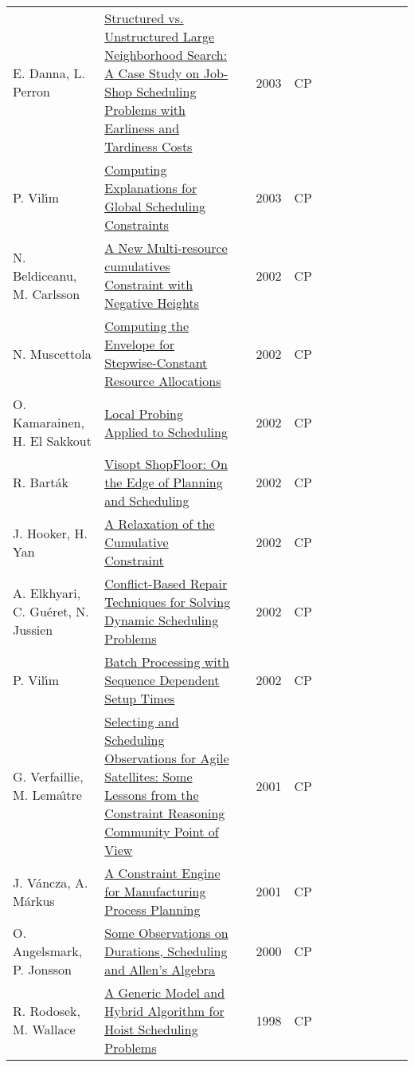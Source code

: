 {\begin{longtable}{p{3cm}p{6cm}rrcrlcccp{1.5cm}l}
E. Danna, L. Perron& \href{papers/DannaP03.pdf}{Structured vs. Unstructured Large Neighborhood Search: {A} Case Study on Job-Shop Scheduling Problems with Earliness and Tardiness Costs} & \cite{DannaP03} & 2003 & CP & & & & & & & \\
P. Vil{\'{\i}}m& \href{papers/Vilim03.pdf}{Computing Explanations for Global Scheduling Constraints} & \cite{Vilim03} & 2003 & CP & & & & & & & \\
N. Beldiceanu, M. Carlsson& \href{papers/BeldiceanuC02.pdf}{A New Multi-resource cumulatives Constraint with Negative Heights} & \cite{BeldiceanuC02} & 2002 & CP & & & & & & & \\
N. Muscettola& \href{papers/Muscettola02.pdf}{Computing the Envelope for Stepwise-Constant Resource Allocations} & \cite{Muscettola02} & 2002 & CP & & & & & & & \\
O. Kamarainen, H. El Sakkout& \href{papers/KamarainenS02.pdf}{Local Probing Applied to Scheduling} & \cite{KamarainenS02} & 2002 & CP & & & & & & & \\
R. Bart{\'{a}}k& \href{papers/Bartak02.pdf}{Visopt ShopFloor: On the Edge of Planning and Scheduling} & \cite{Bartak02} & 2002 & CP & & & & & & & \\
J. Hooker, H. Yan& \href{papers/HookerY02.pdf}{A Relaxation of the Cumulative Constraint} & \cite{HookerY02} & 2002 & CP & & & & & & & \\
A. Elkhyari, C. Gu{\'{e}}ret, N. Jussien& \href{papers/ElkhyariGJ02.pdf}{Conflict-Based Repair Techniques for Solving Dynamic Scheduling Problems} & \cite{ElkhyariGJ02} & 2002 & CP & & & & & & & \\
P. Vil{\'{\i}}m& \href{papers/Vilim02.pdf}{Batch Processing with Sequence Dependent Setup Times} & \cite{Vilim02} & 2002 & CP & & & & & & & \\
G. Verfaillie, M. Lema{\^{\i}}tre& \href{papers/VerfaillieL01.pdf}{Selecting and Scheduling Observations for Agile Satellites: Some Lessons from the Constraint Reasoning Community Point of View} & \cite{VerfaillieL01} & 2001 & CP & & & & & & & \\
J. V{\'{a}}ncza, A. M{\'{a}}rkus& \href{papers/VanczaM01.pdf}{A Constraint Engine for Manufacturing Process Planning} & \cite{VanczaM01} & 2001 & CP & & & & & & & \\
O. Angelsmark, P. Jonsson& \href{papers/AngelsmarkJ00.pdf}{Some Observations on Durations, Scheduling and Allen's Algebra} & \cite{AngelsmarkJ00} & 2000 & CP & & & & & & & \\
R. Rodosek, M. Wallace& \href{papers/RodosekW98.pdf}{A Generic Model and Hybrid Algorithm for Hoist Scheduling Problems} & \cite{RodosekW98} & 1998 & CP & & & & & & & \\

\end{longtable}}
